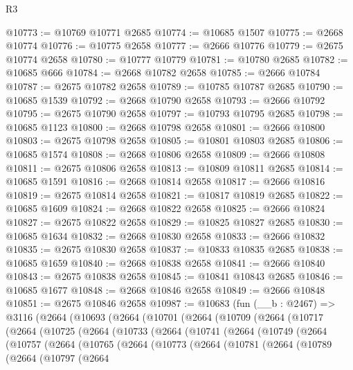 \begin{lexlean}{R3}
\begin{coremodule}
@10773 := @10769 @10771 @2685
@10774 := @10685 @1507
@10775 := @2668 @10774
@10776 := @10775 @2658
@10777 := @2666 @10776
@10779 := @2675 @10774 @2658
@10780 := @10777 @10779
@10781 := @10780 @2685
@10782 := @10685 @666
@10784 := @2668 @10782 @2658
@10785 := @2666 @10784
@10787 := @2675 @10782 @2658
@10789 := @10785 @10787 @2685
@10790 := @10685 @1539
@10792 := @2668 @10790 @2658
@10793 := @2666 @10792
@10795 := @2675 @10790 @2658
@10797 := @10793 @10795 @2685
@10798 := @10685 @1123
@10800 := @2668 @10798 @2658
@10801 := @2666 @10800
@10803 := @2675 @10798 @2658
@10805 := @10801 @10803 @2685
@10806 := @10685 @1574
@10808 := @2668 @10806 @2658
@10809 := @2666 @10808
@10811 := @2675 @10806 @2658
@10813 := @10809 @10811 @2685
@10814 := @10685 @1591
@10816 := @2668 @10814 @2658
@10817 := @2666 @10816
@10819 := @2675 @10814 @2658
@10821 := @10817 @10819 @2685
@10822 := @10685 @1609
@10824 := @2668 @10822 @2658
@10825 := @2666 @10824
@10827 := @2675 @10822 @2658
@10829 := @10825 @10827 @2685
@10830 := @10685 @1634
@10832 := @2668 @10830 @2658
@10833 := @2666 @10832
@10835 := @2675 @10830 @2658
@10837 := @10833 @10835 @2685
@10838 := @10685 @1659
@10840 := @2668 @10838 @2658
@10841 := @2666 @10840
@10843 := @2675 @10838 @2658
@10845 := @10841 @10843 @2685
@10846 := @10685 @1677
@10848 := @2668 @10846 @2658
@10849 := @2666 @10848
@10851 := @2675 @10846 @2658
@10987 := @10683
    (fun (__b : @2467) =>
    @3116
      (@2664
        (@10693
          (@2664
            (@10701
              (@2664
                (@10709
                  (@2664
                    (@10717
                      (@2664
                        (@10725
                          (@2664
                            (@10733
                              (@2664
                                (@10741
                                  (@2664
                                    (@10749
                                      (@2664
                                        (@10757
                                          (@2664
                                            (@10765
                                              (@2664
                                                (@10773
                                                  (@2664
                                                    (@10781
                                                      (@2664
                                                        (@10789
                                                          (@2664
                                                            (@10797
                                                              (@2664

\end{coremodule}
\end{lexlean}
